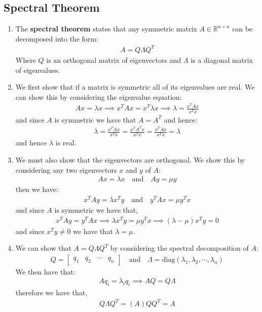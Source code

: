 \documentclass[letterpaper, 11pt]{article}
\newcommand{\R}{\mathbb{R}}	%
\newcommand{\1}{\mathds{1}}	%
\theoremstyle{definition}
\begin{document}
\subsection{Spectral Theorem}
\begin{enumerate}
    \item The \textbf{spectral theorem} states that any symmetric matrix $A \in \R^{n \times n}$ can be decomposed into the form:
    \begin{align}
        A = Q \Lambda Q^T
    \end{align}
    Where $Q$ is an orthogonal matrix of eigenvectors and $\Lambda$ is a diagonal matrix of eigenvalues.

    \item We first show that if a matrix is symmetric all of its eigenvalues are real. We can show this by considering the eigenvalue equation:
    \begin{align}
        A x = \lambda x \implies x^T A x = x^T \lambda x \implies \lambda = \frac{x^T A x}{x^T x}
    \end{align}
    and since $A$ is symmetric we have that $A = A^T$ and hence:
    \begin{align}
        \lambda = \frac{x^T A x}{x^T x} = \frac{x^T A^T x}{x^T x} = \frac{x^T A x}{x^T x} = \lambda
    \end{align}
    and hence $\lambda$ is real.

    \item We must also show that the eigenvectors are orthogonal. We show this by considering any two eigenvectors $x$ and $y$ of $A$:
    \begin{align}
        A x = \lambda x \quad \text{and} \quad A y = \mu y
    \end{align}
    then we have:
    \begin{align}
        x^T A y = \lambda x^T y \quad \text{and} \quad y^T A x = \mu y^T x
    \end{align}
    and since $A$ is symmetric we have that,
    \begin{align}
        x^T A y = y^T A x \implies \lambda x^T y = \mu y^T x \implies (\lambda - \mu) x^T y = 0
    \end{align}
    and since $x^T y \neq 0$ we have that $\lambda = \mu$.
    \item We can show that $A = Q \Lambda Q^T$ by considering the spectral decomposition of $A$:
    \begin{align}
        Q = \begin{bmatrix} q_1 & q_2 & \cdots & q_n \end{bmatrix} \quad \text{and} \quad \Lambda = \text{diag}(\lambda_1, \lambda_2, \cdots, \lambda_n)
    \end{align}
    We then have that:
    \begin{align}
        A q_i = \lambda_i q_i \implies A Q = Q \Lambda
    \end{align} 
    therefore we have that,
    \begin{align}
        Q \Lambda Q^T = (A) Q Q^T = A
    \end{align}


\end{enumerate}
\end{document}
